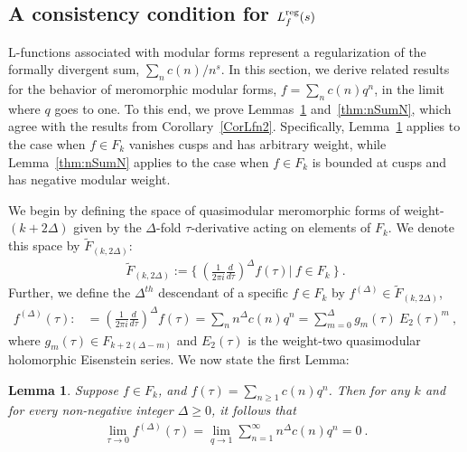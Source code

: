 \documentclass[11pt,a4paper]{article}
\newtheorem{lem}[thm]{Lemma}
\newcommand{\reg}{{\rm reg}}
\begin{document}
\subsection{A consistency condition for $L_f^\reg(s)$}\label{svAltSum}

L-functions associated with modular forms represent a regularization of the formally divergent sum, $\sum_n c(n)/n^s$. In this section, we derive related results for the behavior of meromorphic modular forms, $f = \sum_n c(n) q^n$, in the limit where $q$ goes to one. To this end, we prove Lemmas~\ref{thm:nSumCP} and~\ref{thm:nSumN}, which agree with the results from Corollary~\ref{CorLfn2}. Specifically, Lemma~\ref{thm:nSumCP} applies to the case when $f \in F_k$ vanishes cusps and has arbitrary weight, while Lemma~\ref{thm:nSumN} applies to the case when $f \in F_k$ is bounded at cusps and has negative modular weight. 

We begin by defining the space of quasimodular meromorphic forms of weight-$(k+2\Delta)$ given by the $\Delta$-fold $\tau$-derivative acting on elements of $F_k$. We denote this space by $\tilde{F}_{(k,2 \Delta)}$:
\begin{align}
\tilde{F}_{(k,2\Delta)} := \bigg\{~ \left(\frac{1}{2 \pi i}\frac{d}{d \tau}\right)^\Delta f(\tau) \bigg| ~f \in F_k ~\bigg\}~. \label{eqTildeF1}
\end{align}
Further, we define the $\Delta^{th}$ descendant of a specific $f \in F_k$ by $f^{(\Delta)} \in \tilde{F}_{(k,2\Delta)}$,
\begin{align}
f^{(\Delta)}(\tau) 
:&= \left(\frac{1}{2 \pi i} \frac{d}{d\tau}\right)^\Delta f(\tau) 
= \sum_n n^\Delta c(n) q^n 
= \sum_{m = 0}^{\Delta} g_m(\tau) ~ E_2(\tau)^m~,  \label{eqTildeF2}
\end{align}
where $g_m(\tau) \in F_{k+2(\Delta-m)}$ and $E_2(\tau)$ is the weight-two quasimodular holomorphic Eisenstein series. We now state the first Lemma:

\begin{lem}\label{thm:nSumCP}
Suppose $f \in F_k$, and $f(\tau) = \sum_{n \geq 1} c(n) q^n$. Then for any $k$ and for every non-negative integer $\Delta \geq 0$, it follows that 
\begin{align}
\lim_{\tau \to 0} f^{(\Delta)}(\tau) = \lim_{q \to 1} \sum_{n = 1}^{\infty} n^{\Delta} c(n) q^n =0 ~\label{s=NbCP}.
\end{align}
\end{lem}
\end{document}
